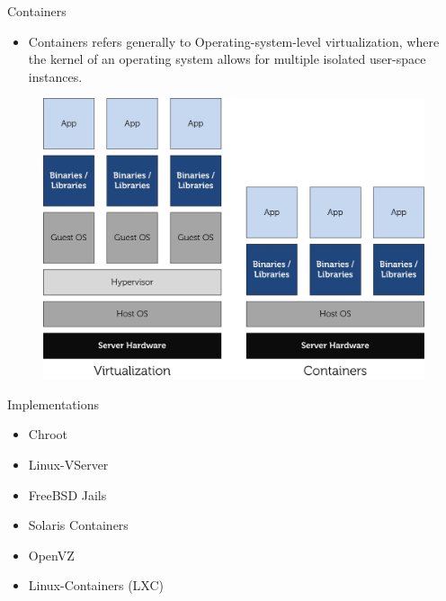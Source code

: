 \documentclass[presentation]{beamer}
\begin{document}
\begin{frame}[label=sec-1-2]{Containers}
\begin{itemize}
\item \alert{Containers} refers generally to \alert{Operating-system-level virtualization},
where the \alert{kernel} of an operating system allows for multiple isolated \alert{user-space instances}.
\end{itemize}

\begin{figure}[!h]
  \center
  \includegraphics[scale=0.65]{figures/lxc-vm.jpg}
  \label{fig:hpc}
\end{figure}
\end{frame}

\begin{frame}[label=sec-1-3]{Implementations}
\begin{itemize}
\item Chroot
\item Linux-VServer
\item FreeBSD Jails
\item Solaris Containers
\item OpenVZ
\item Linux-Containers (LXC)
\end{itemize}
\end{frame}
\end{document}
